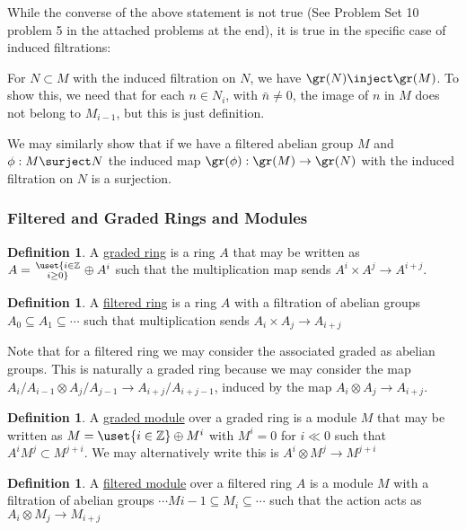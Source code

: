 \documentclass[12 pt]{article}
\theoremstyle{definition}
\newtheorem{defn}[thm]{Definition}
\renewcommand{\(}{\left(}
\renewcommand{\)}{\right)}
\newcommand\zz{\mathbb{Z}}
\begin{document}
While the converse of the above statement is not true (See Problem Set 10 problem 5 in the attached problems at the end), it is true in the specific case of induced filtrations:

For $N \subset M$ with the induced filtration on $N$, we have $\gr(N) \inject \gr(M)$. To show this, we need that for each $n \in N_i$, with $\bar{n} \neq 0$, the image of $n$ in $M$ does not belong to $M_{i-1}$, but this is just definition.

We may similarly show that if we have a filtered abelian group $M$ and $\phi: M \surject N$ the induced map $\gr(\phi):\gr(M) \to \gr(N)$ with the induced filtration on $N$ is a surjection.

\subsubsection{Filtered and Graded Rings and Modules}

\begin{defn} A \underline{graded ring} is a ring $A$ that may be written as $A=\uset{i \in \zz \atop i \geq 0}\oplus A^i$ such that the multiplication map sends $A^i \times A^j \to A^{i+j}$.
\end{defn}

\begin{defn} A \ul{filtered ring} is a ring $A$ with a filtration of abelian groups $A_0 \subseteq A_1 \subseteq \cdots$ such that multiplication sends $A_i \times A_j \to A_{i+j}$
\end{defn}

Note that for a filtered ring we may consider the associated graded as abelian groups. This is naturally a graded ring because we may consider the map $A_i/A_{i-1} \otimes A_j/A_{j-1} \to A_{i+j}/A_{i+j-1}$, induced by the map $A_i \otimes A_j \to A_{i+j}$.


\begin{defn} A \underline{graded module} over a graded ring is a module $M$ that may be written as $M=\uset{i \in \zz}\oplus M^i$ with $M^i=0$ for $i\ll 0$ such that $A^iM^j \subset M^{j+i}$. We may alternatively write this is $A^i \otimes M^j \to M^{j+i}$
\end{defn}

\begin{defn} A \ul{filtered module} over a filtered ring $A$ is a module $M$ with a filtration of abelian groups $\cdots M{i-1} \subseteq M_i \subseteq \cdots$ such that the action acts as $A_i \otimes M_j \to M_{i+j}$
\end{defn}
\end{document}
